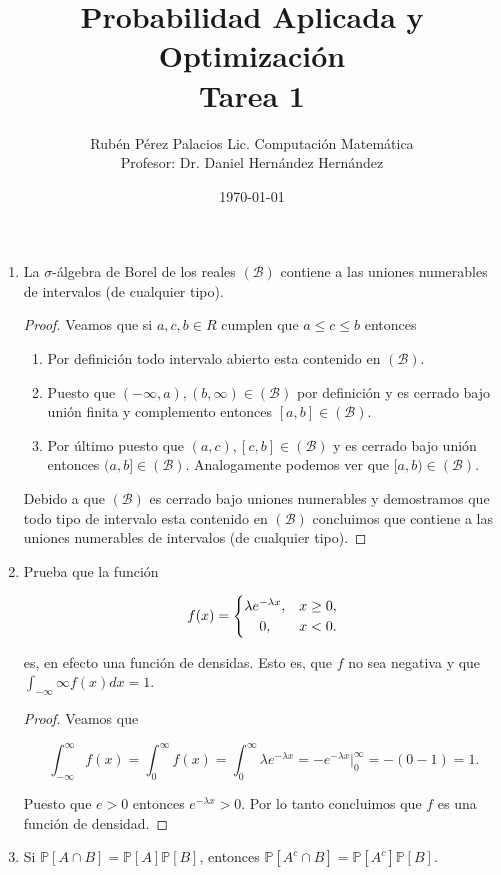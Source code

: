 \documentclass[letterpaper]{article}
\title{Probabilidad Aplicada y Optimización \\ Tarea 1}
\author{Rubén Pérez Palacios Lic. Computación Matemática\\Profesor: Dr. Daniel Hernández Hernández}
\date{\today}
\theoremstyle{definition}
\theoremstyle{lemathm}
\theoremstyle{lemathm}
\theoremstyle{lemathm}
\theoremstyle{lemademthm}
\newcommand{\pars}[1]{\left( #1 \right) }
\newcommand{\bracs}[1]{\left[ #1 \right] }
\newcommand{\PP}{\mathbb{P}}
\newcommand{\1}{\mathbbm{1}}
\begin{document}
	\maketitle

	\begin{enumerate}
		\item La $\sigma$-álgebra de Borel de los reales $\pars{\mathcal{B}}$ contiene a las uniones numerables de intervalos (de cualquier tipo).
		
		\begin{proof}
			Veamos que si $a,c,b \in R$ cumplen que $a\leq c \leq b$ entonces
			
			\begin{enumerate}
				\item Por definición todo intervalo abierto esta contenido en $\pars{\mathcal{B}}$.
				\item Puesto que $(-\infty,a),(b,\infty) \in \pars{\mathcal{B}}$ por definición y es cerrado bajo unión finita y complemento entonces $[a,b] \in \pars{\mathcal{B}}$.
				\item Por último puesto que $(a,c),[c,b] \in \pars{\mathcal{B}}$ y es cerrado bajo unión entonces $(a,b] \in \pars{\mathcal{B}}$. Analogamente podemos ver que $[a,b) \in \pars{\mathcal{B}}$.
			\end{enumerate}

			Debido a que $\pars{\mathcal{B}}$ es cerrado bajo uniones numerables y demostramos que todo tipo de intervalo esta contenido en $\pars{\mathcal{B}}$ concluimos que contiene a las uniones numerables de intervalos (de cualquier tipo).
		\end{proof}

		\item Prueba que la función
		
		\[
			f(x) = \begin{cases}
				\lambda e^{-\lambda x}, & x\geq 0,\\
				\hfil 0, & x < 0.
			\end{cases}
		\]

		es, en efecto una función de densidas. Esto es, que $f$ no sea negativa y que $\int_{-\infty}{\infty} f(x)dx = 1$.

		\begin{proof}
			Veamos que

			\[
				\int_{-\infty}^{\infty} f(x) = \int_{0}^{\infty} f(x) = \int_{0}^{\infty} \lambda e^{-\lambda x} = -e^{-\lambda x} \Big|_0^\infty = -(0-1) = 1.
			\]

			Puesto que $e > 0$ entonces $e^{-\lambda x} > 0$. Por lo tanto concluimos que $f$ es una función de densidad.
		\end{proof}
		\item Si $\PP\bracs{A\cap B} = \PP\bracs{A}\PP\bracs{B}$, entonces $\PP\bracs{A^c \cap B} = \PP\bracs{A^c}\PP\bracs{B}$.
		

\end{enumerate}
\end{document}
